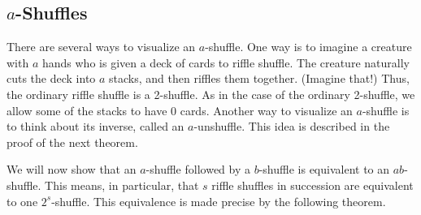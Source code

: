 \subsection*{$a$-Shuffles}
There are several ways to visualize an $a$-shuffle.  One way is to imagine a
creature with $a$ hands who is given a deck of cards to riffle shuffle.  The creature 
naturally cuts the deck into
$a$ stacks, and then riffles them together.  (Imagine that!)  Thus, the ordinary
riffle shuffle is a 2-shuffle.  As in the case of the ordinary 2-shuffle, we allow
some of the stacks to have 0 cards.  Another way to visualize an $a$-shuffle is to
think about its inverse, called an
$a$-unshuffle.  This idea is described in the proof of the next theorem.
\par We will now show that an $a$-shuffle followed by a $b$-shuffle is equivalent to an
$ab$-shuffle.  This means, in particular, that $s$ riffle shuffles in succession are
equivalent to one
$2^s$-shuffle.  This equivalence is made precise by the following theorem.
\noindent
